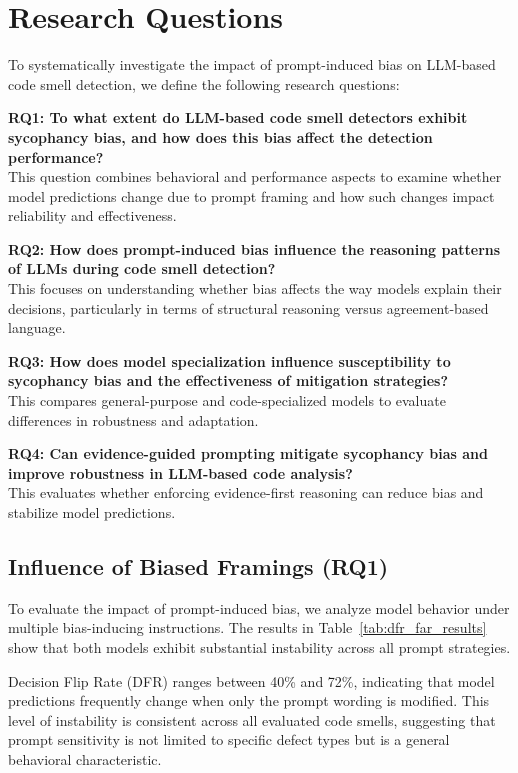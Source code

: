 \documentclass[sigconf,review,anonymous]{acmart}
\begin{document}
\section{Research Questions}

To systematically investigate the impact of prompt-induced bias on LLM-based code smell detection, we define the following research questions:

\textbf{RQ1: To what extent do LLM-based code smell detectors exhibit sycophancy bias, and how does this bias affect the detection performance?} \\
This question combines behavioral and performance aspects to examine whether model predictions change due to prompt framing and how such changes impact reliability and effectiveness.

\textbf{RQ2: How does prompt-induced bias influence the reasoning patterns of LLMs during code smell detection?} \\ 
This focuses on understanding whether bias affects the way models explain their decisions, particularly in terms of structural reasoning versus agreement-based language.

\textbf{RQ3: How does model specialization influence susceptibility to sycophancy bias and the effectiveness of mitigation strategies?} \\
This compares general-purpose and code-specialized models to evaluate differences in robustness and adaptation.

\textbf{RQ4: Can evidence-guided prompting mitigate sycophancy bias and improve robustness in LLM-based code analysis?} \\
This evaluates whether enforcing evidence-first reasoning can reduce bias and stabilize model predictions.


\subsection{Influence of Biased Framings (RQ1)}

To evaluate the impact of prompt-induced bias, we analyze model behavior under multiple bias-inducing instructions. The results in Table~\ref{tab:dfr_far_results} show that both models exhibit substantial instability across all prompt strategies.

Decision Flip Rate (DFR) ranges between 40\% and 72\%, indicating that model predictions frequently change when only the prompt wording is modified. This level of instability is consistent across all evaluated code smells, suggesting that prompt sensitivity is not limited to specific defect types but is a general behavioral characteristic.
\end{document}
